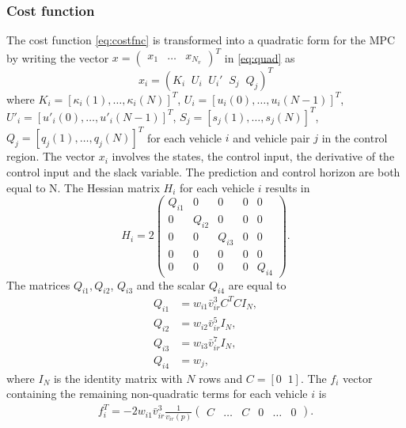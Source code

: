 \documentclass[letterpaper,10pt,conference]{ieeeconf}
\newcommand{\red}[1]{\textcolor{red}{#1}}  %
\begin{document}
\subsubsection{Cost function}
The cost function \eqref{eq:costfnc} is transformed into a quadratic form for the MPC by writing the vector $x=\begin{pmatrix}x_1&\dots&x_{N_v}  \end{pmatrix}^T$ in \eqref{eq:quad} as
\begin{equation}
x_i=%
(K_i \;\; U_i\;\; U_i' \;\; S_j \;\; Q_j)^T
\end{equation}
where $K_i=[\kappa_i(1),\ldots,\kappa_i(N)]^T$, $U_i=[u_i(0),\ldots,u_i(N-1)]^T$, $U'_i=[u'_i(0),\ldots,u'_i(N-1)]^T$, $S_j=[s_j(1),\ldots,s_j(N)]^T$, $Q_j=[q_j(1),\ldots,q_j(N)]^T$ for each vehicle $i$ and vehicle pair $j$ in the control region.
The vector $x_i$ involves the states, the control input, the derivative of the control input and the slack variable. The prediction and control horizon are both equal to N. The Hessian matrix $H_i$ for each vehicle $i$ results in
\begin{equation}\label{eq:hessian}
H_i = 2
\begin{pmatrix}
    Q_{i1} & 0 & 0 & 0 & 0 \\
    0 & Q_{i2} & 0 & 0 & 0 \\
    0 & 0 & Q_{i3} & 0 & 0 \\
    0 & 0 & 0 & 0 & 0  \\
    0 & 0 & 0 & 0 & Q_{i4}
\end{pmatrix}.
\end{equation}
The matrices $Q_{i1}, Q_{i2}$, $Q_{i3}$ and the scalar $Q_{i4}$ are equal to
\begin{subequations}
\begin{align}
Q_{i1} &= w_{i1}\bar{v}_{ir}^3 C^TC I_N, \\
Q_{i2} &=  w_{i2}\bar{v}_{ir}^5I_N ,\\
Q_{i3} &= w_{i3}\bar{v}_{ir}^7I_N, \\
Q_{i4} &= w_j,
\end{align}
\end{subequations}
where $I_N$ is the identity matrix with $N$ rows and $C=[0 \;\; 1]$.
The $f_i$ vector containing the remaining non-quadratic terms for each vehicle $i$ is
\begin{align}
f_i^T =-2w_{i1}\bar{v}_{ir}^3\frac{1}{v_{ir}(p)} \begin{pmatrix} C & \hdots & C & 0 &\hdots & 0 \end{pmatrix}.
\end{align}
\end{document}
